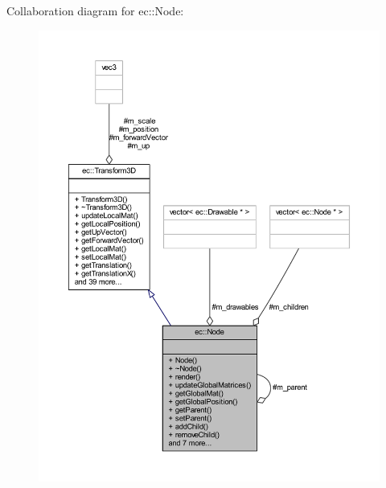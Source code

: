Collaboration diagram for ec\+:\+:Node\+:\nopagebreak
\begin{figure}[H]
\begin{center}
\leavevmode
\includegraphics[width=350pt]{classec_1_1_node__coll__graph}
\end{center}
\end{figure}
